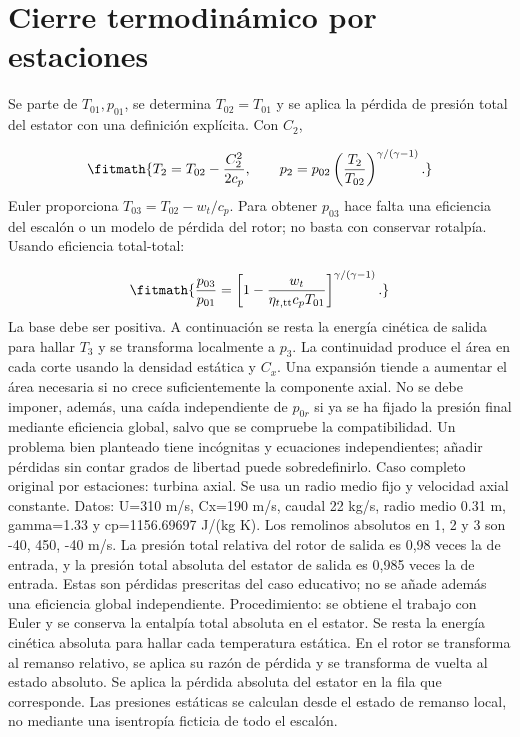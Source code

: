 \documentclass[10pt,openany]{book}
\begin{document}
\section{Cierre termodinámico por estaciones}

Se parte de \(T_{01},p_{01}\), se determina \(T_{02}=T_{01}\) y se aplica la pérdida de presión total del estator con una definición explícita. Con \(C_2\),

\[
\fitmath{T_2=T_{02}-\frac{C_2^2}{2c_p},\qquad p_2=p_{02}\left(\frac{T_2}{T_{02}}\right)^{\gamma/(\gamma-1)}.}
\]
Euler proporciona \(T_{03}=T_{02}-w_t/c_p\). Para obtener \(p_{03}\) hace falta una eficiencia del escalón o un modelo de pérdida del rotor; no basta con conservar rotalpía. Usando eficiencia total-total:

\[
\fitmath{\frac{p_{03}}{p_{01}}=\left[1-\frac{w_t}{\eta_{t,\mathrm{tt}}c_pT_{01}}\right]^{\gamma/(\gamma-1)}.}
\]
La base debe ser positiva. A continuación se resta la energía cinética de salida para hallar \(T_3\) y se transforma localmente a \(p_3\). La continuidad produce el área en cada corte usando la densidad estática y \(C_x\). Una expansión tiende a aumentar el área necesaria si no crece suficientemente la componente axial.
No se debe imponer, además, una caída independiente de \(p_{0r}\) si ya se ha fijado la presión final mediante eficiencia global, salvo que se compruebe la compatibilidad. Un problema bien planteado tiene incógnitas y ecuaciones independientes; añadir pérdidas sin contar grados de libertad puede sobredefinirlo.
Caso completo original por estaciones: turbina axial. Se usa un radio medio fijo y velocidad axial constante. Datos: U=310 m/s, Cx=190 m/s, caudal 22 kg/s, radio medio 0.31 m, gamma=1.33 y cp=1156.69697 J/(kg K). Los remolinos absolutos en 1, 2 y 3 son -40, 450, -40 m/s. La presión total relativa del rotor de salida es 0,98 veces la de entrada, y la presión total absoluta del estator de salida es 0,985 veces la de entrada. Estas son pérdidas prescritas del caso educativo; no se añade además una eficiencia global independiente.
Procedimiento: se obtiene el trabajo con Euler y se conserva la entalpía total absoluta en el estator. Se resta la energía cinética absoluta para hallar cada temperatura estática. En el rotor se transforma al remanso relativo, se aplica su razón de pérdida y se transforma de vuelta al estado absoluto. Se aplica la pérdida absoluta del estator en la fila que corresponde. Las presiones estáticas se calculan desde el estado de remanso local, no mediante una isentropía ficticia de todo el escalón.
\end{document}
